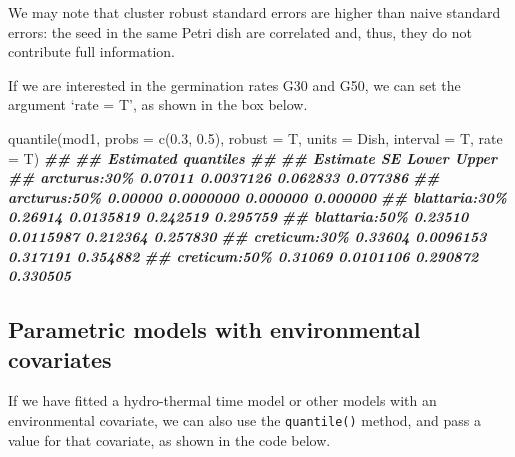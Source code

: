 \documentclass[
]{book}
\newenvironment{Shaded}{\begin{snugshade}}{\end{snugshade}}
\newcommand{\AttributeTok}[1]{\textcolor[rgb]{0.77,0.63,0.00}{#1}}
\newcommand{\DocumentationTok}[1]{\textcolor[rgb]{0.56,0.35,0.01}{\textbf{\textit{#1}}}}
\newcommand{\FloatTok}[1]{\textcolor[rgb]{0.00,0.00,0.81}{#1}}
\newcommand{\FunctionTok}[1]{\textcolor[rgb]{0.00,0.00,0.00}{#1}}
\newcommand{\NormalTok}[1]{#1}
\begin{document}
We may note that cluster robust standard errors are higher than naive standard errors: the seed in the same Petri dish are correlated and, thus, they do not contribute full information.

If we are interested in the germination rates G30 and G50, we can set the argument `rate = T', as shown in the box below.

\begin{Shaded}
\begin{Highlighting}[]
\FunctionTok{quantile}\NormalTok{(mod1, }\AttributeTok{probs =} \FunctionTok{c}\NormalTok{(}\FloatTok{0.3}\NormalTok{, }\FloatTok{0.5}\NormalTok{), }\AttributeTok{robust =}\NormalTok{ T,}
         \AttributeTok{units =}\NormalTok{ Dish,}
         \AttributeTok{interval =}\NormalTok{ T, }\AttributeTok{rate =}\NormalTok{ T)}
\DocumentationTok{\#\# }
\DocumentationTok{\#\# Estimated quantiles}
\DocumentationTok{\#\# }
\DocumentationTok{\#\#               Estimate        SE    Lower    Upper}
\DocumentationTok{\#\# arcturus:30\%   0.07011 0.0037126 0.062833 0.077386}
\DocumentationTok{\#\# arcturus:50\%   0.00000 0.0000000 0.000000 0.000000}
\DocumentationTok{\#\# blattaria:30\%  0.26914 0.0135819 0.242519 0.295759}
\DocumentationTok{\#\# blattaria:50\%  0.23510 0.0115987 0.212364 0.257830}
\DocumentationTok{\#\# creticum:30\%   0.33604 0.0096153 0.317191 0.354882}
\DocumentationTok{\#\# creticum:50\%   0.31069 0.0101106 0.290872 0.330505}
\end{Highlighting}
\end{Shaded}

\hypertarget{parametric-models-with-environmental-covariates}{%
\subsection{Parametric models with environmental covariates}\label{parametric-models-with-environmental-covariates}}

If we have fitted a hydro-thermal time model or other models with an environmental covariate, we can also use the \texttt{quantile()} method, and pass a value for that covariate, as shown in the code below.
\end{document}
